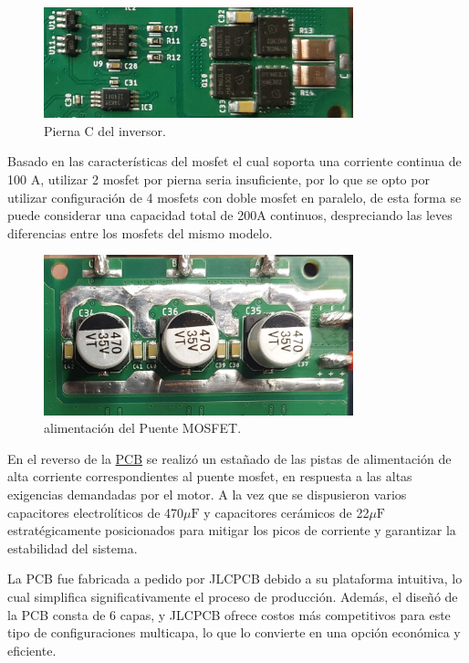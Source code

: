 \documentclass[11pt]{report}
\begin{document}
\begin{figure}[ht]
	\centering
	\includegraphics[width=0.8\textwidth]{imagenes/PCB/FULL_Pierna_C.jpg}
	\caption{Pierna C del inversor.}
	\label{PCB_pierna_C}
\end{figure}
\FloatBarrier

Basado en las características del mosfet el cual soporta una corriente continua de 100 A, utilizar 2 mosfet por pierna seria insuficiente, por lo que se opto por utilizar configuración de 4 mosfets con doble mosfet en paralelo, de esta forma se puede considerar una capacidad total de 200A continuos, despreciando las leves diferencias entre los mosfets del mismo modelo.

\begin{figure}[ht]
	\centering
	\includegraphics[width=0.8\textwidth]{imagenes/PCB/alimentacion mosfet.jpg}
	\caption{alimentación del Puente MOSFET.}
	\label{alimentacion}
\end{figure}
\FloatBarrier

En el reverso de la \href{https://www.youtube.com/watch?v=J---aiyznGQ}{PCB} se realizó un estañado de las pistas de alimentación de alta corriente correspondientes al puente mosfet, en respuesta a las altas exigencias demandadas por el motor. A la vez que se dispusieron varios capacitores electrolíticos de 470$\mu\text{F}$ y capacitores cerámicos de 22$\mu\text{F}$ estratégicamente posicionados para mitigar los picos de corriente y garantizar la estabilidad del sistema.

La PCB fue fabricada a pedido por JLCPCB debido a su plataforma intuitiva, lo cual simplifica significativamente el proceso de producción. Además, el diseñó de la PCB consta de 6 capas, y JLCPCB ofrece costos más competitivos para este tipo de configuraciones multicapa, lo que lo convierte en una opción económica y eficiente.
\end{document}
